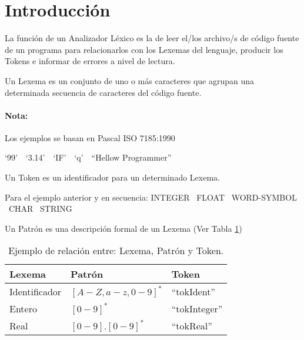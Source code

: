 \label{chap:lexAnalycer}

\section{Introducción}

 La función de un Analizador Léxico es la de leer el/los archivo/s
de código fuente de un programa para relacionarlos con los Lexemas del
lenguaje, producir los Tokens e informar de errores a
nivel de lectura.

 Un Lexema es un conjunto de uno o más caracteres que
agrupan una determinada secuencia de caracteres del código fuente.

\paragraph*{Nota:} Los ejemplos se basan en Pascal ISO 7185:1990

\ejem `99'\ \textbar\ `3.14'\ \textbar\ `IF'\ \textbar\ `q'\ \textbar\ ``Hellow Programmer''

 Un Token es un identificador para un determinado Lexema.

\ejem Para el ejemplo anterior y en secuencia: INTEGER \textbar\ FLOAT \textbar\
WORD-SYMBOL \textbar\ CHAR \textbar\ STRING

 Un Patrón es una descripción formal de un Lexema (Ver Tabla \ref{tab:examplePatTokLex})

\begin{table}

\begin{center}

\begin{tabular}{|l|l|l|}\hline
\textbf{Lexema} & \textbf{Patrón} & \textbf{Token} \\
\hline
\hline
Identificador & $[A-Z, a-z, 0-9]^*$ & ``tokIdent'' \\ \hline
Entero & $[0-9]^*$ & ``tokInteger'' \\ \hline
Real & $[0-9].[0-9]^*$ & ``tokReal'' \\ \hline
\end{tabular}

\caption{Ejemplo de relación entre: Lexema, Patrón y Token.}\label{tab:examplePatTokLex}

\end{center}

\end{table}

